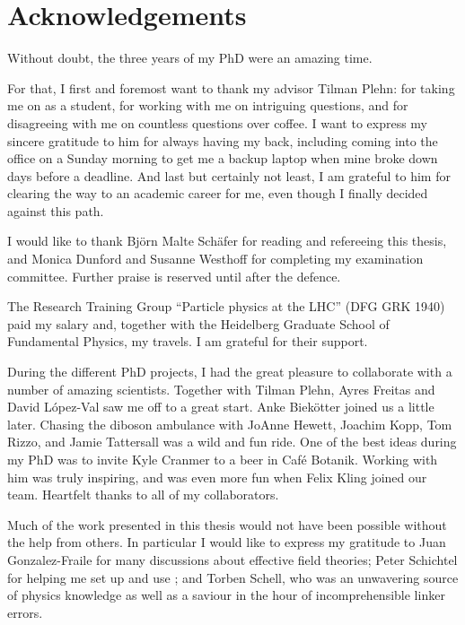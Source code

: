 
\chapter*{Acknowledgements}

Without doubt, the three years of my PhD were an amazing time.

For that, I first and foremost want to thank my advisor Tilman Plehn:
for taking me on as a student, for working with me on intriguing
questions, and for disagreeing with me on countless questions over
coffee. I want to express my sincere gratitude to him for always
having my back, including coming into the office on a Sunday morning
to get me a backup laptop when mine broke down days before a
deadline. And last but certainly not least, I am grateful to him for
clearing the way to an academic career for me, even though I finally
decided against this path.

I would like to thank Bj\"orn Malte Sch\"afer for reading and
refereeing this thesis, and Monica Dunford and Susanne Westhoff for
completing my examination committee. Further praise is reserved until
after the defence.

The Research Training Group ``Particle physics at the LHC'' (DFG GRK
1940) paid my salary and, together with the Heidelberg Graduate School
of Fundamental Physics, my travels. I am grateful for their support.

During the different PhD projects, I had the great pleasure to
collaborate with a number of amazing scientists. Together with Tilman
Plehn, Ayres Freitas and David L\'opez-Val saw me off to a great
start. Anke Biek\"otter joined us a little later. Chasing the diboson
ambulance with JoAnne Hewett, Joachim Kopp, Tom Rizzo, and Jamie
Tattersall was a wild and fun ride. One of the best ideas during my
PhD was to invite Kyle Cranmer to a beer in Caf\'e Botanik. Working
with him was truly inspiring, and was even more fun when Felix Kling
joined our team.  Heartfelt thanks to all of my collaborators.

Much of the work presented in this thesis would not have been possible
without the help from others. In particular I would like to express my
gratitude to Juan Gonzalez-Fraile for many discussions about effective
field theories; Peter Schichtel for helping me set up and use
; and Torben Schell, who was an unwavering source of
physics knowledge as well as a saviour in the hour of incomprehensible
linker errors.

